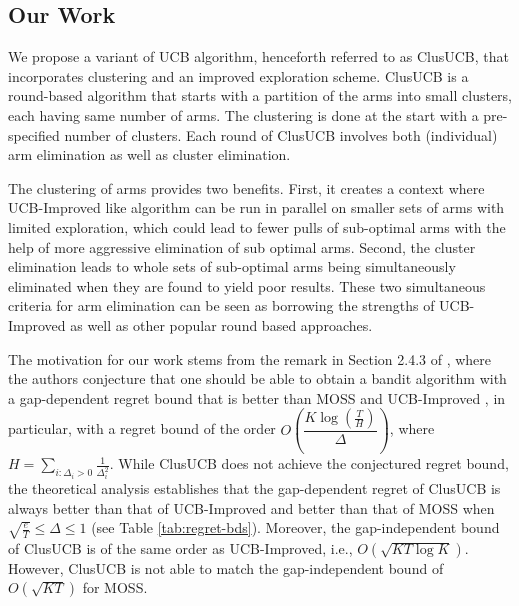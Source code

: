 \subsection*{Our Work}
We propose a variant of UCB algorithm, henceforth referred to as ClusUCB, that incorporates clustering and an improved exploration scheme. ClusUCB is a round-based algorithm that
starts with a partition of the arms into small clusters, each having same number of arms. 
The clustering is done at the start with a pre-specified number of clusters. 
Each round of ClusUCB involves both (individual) arm elimination as well as cluster elimination. 


The clustering of arms provides two benefits. First, it creates a context where UCB-Improved like algorithm can be run in parallel on smaller sets of arms with limited exploration, which could lead to fewer pulls of sub-optimal arms with the help of  more aggressive elimination of sub optimal arms. Second, the cluster elimination leads to whole sets of sub-optimal arms being simultaneously eliminated when they are found to yield poor results. These two simultaneous criteria for arm elimination can be seen as borrowing the strengths of UCB-Improved as well as other popular round based approaches.

The motivation for our work stems from the remark in Section 2.4.3 of \cite{bubeck2012bandits}, where the authors conjecture that one should be able to obtain a bandit algorithm with a
gap-dependent regret bound that is better than MOSS \cite{audibert2009minimax} and UCB-Improved \cite{auer2010ucb}, in particular, with a regret bound of the order 
$O\left(\dfrac{K\log (\frac{T}{H})}{\Delta}\right)$, where $H = \sum_{i:\Delta_i>0} \frac{1}{\Delta_i^2}$. While ClusUCB does not achieve the conjectured regret bound, 
the theoretical analysis establishes
that the gap-dependent regret of ClusUCB is always better than that of UCB-Improved and better than that of MOSS when $\sqrt{\frac{e}{T}} \leq \Delta\leq 1$ (see Table \ref{tab:regret-bds}). Moreover, the gap-independent bound of ClusUCB is of the same order as UCB-Improved, i.e., $O\left(\sqrt{KT\log K}\right)$. However, ClusUCB is not able to match the gap-independent bound of $O(\sqrt{KT})$ for MOSS.


